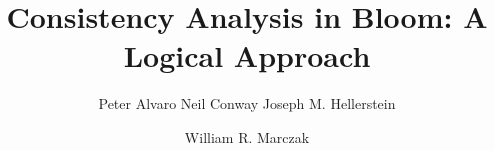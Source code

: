 \documentclass{acm_proc_article-sp}
\begin{document}
\title{Consistency Analysis in Bloom: A Logical Approach}

\author{
\alignauthor
Peter Alvaro
\alignauthor
Neil Conway
\alignauthor
Joseph M. Hellerstein
\and
\alignauthor
William R. Marczak
}


%


\maketitle
\end{document}
